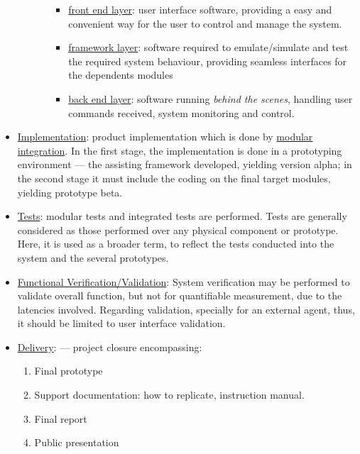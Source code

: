 \begin{itemize}
\begin{itemize}
\begin{itemize}
\begin{itemize}
  \item \uline{front end layer}: user interface software, providing a easy and convenient
    way for the user to control and manage the system.
  \item \uline{framework layer}: software required to emulate/simulate and test the
    required system behaviour, providing seamless interfaces for the dependents
    modules
  \item \uline{back end layer}: software running \emph{behind the scenes}, handling user
    commands received, system monitoring and control.
  \end{itemize}
\end{itemize}
\end{itemize}
\item \uline{Implementation}: product implementation which is done by
  \uline{modular integration}. In the first stage, the implementation is done in a prototyping
environment --- the assisting framework developed, yielding version alpha; in the second stage
it must include the coding on the final target modules, yielding
prototype beta.
\item \uline{Tests}: modular tests and integrated tests are performed. Tests are generally considered as those performed over any physical
component or prototype. Here, it is used as a broader term, to reflect the tests
conducted into the system and the several prototypes.
\item \uline{Functional Verification/Validation}: System verification may be performed to validate overall
  function, but not for quantifiable measurement, due to the latencies
  involved. Regarding validation, specially for an external agent, thus, it should be limited
  to user interface validation.
\item \uline{Delivery}: --- project closure encompassing:
\begin{enumerate}
\item Final prototype
\item Support documentation: how to replicate, instruction manual.
\item Final report
\item Public presentation
\end{enumerate}
\end{itemize}
%